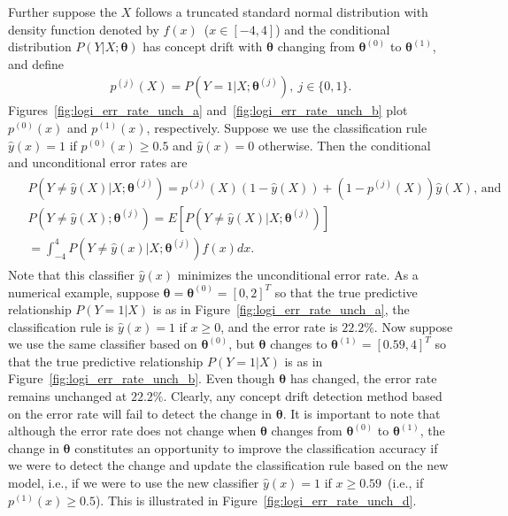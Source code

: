 \documentclass[twoside,11pt]{article}
\begin{document}
Further suppose the $X$ follows a truncated standard normal distribution with density function denoted by $f(x)$~($x\in[-4, 4]$) and the conditional distribution $P(Y|X;\bm{\theta})$ has concept drift with $\bm{\theta}$ changing from $\bm{\theta}^{(0)}$ to $\bm{\theta}^{(1)}$, and define 
\begin{align}
p^{(j)}(X)=P(Y=1|X;\bm{\theta}^{(j)}),~j\in\{0,1\}.
\label{eqn:simp_nota_p}
\end{align}
Figures~\ref{fig:logi_err_rate_unch_a} and~\ref{fig:logi_err_rate_unch_b} plot $p^{(0)}(x)$ and $p^{(1)}(x)$, respectively. Suppose we use the classification rule $\hat{y}(x)=1$ if $p^{(0)}(x)\geq 0.5$ and $\hat{y}(x)=0$ otherwise. Then the conditional and unconditional error rates are
\begin{align}
\begin{aligned}
&P(Y\neq\hat{y}(X)|X;\bm{\theta}^{(j)})
= p^{(j)}(X)(1-\hat{y}(X)) + (1-p^{(j)}(X))\hat{y}(X)\text{,~and} \\
&P(Y\neq\hat{y}(X);\bm{\theta}^{(j)}) = E[P(Y\neq\hat{y}(X)|X;\bm{\theta}^{(j)})] \\ &= \int_{-4}^{4}P(Y\neq\hat{y}(x)|X;\bm{\theta}^{(j)})f(x)dx.
\end{aligned}
\label{eqn:logi_err_rate}
\end{align}
Note that this classifier $\hat{y}(x)$ minimizes the unconditional error rate. As a numerical example, suppose $\bm{\theta} = \bm{\theta}^{(0)}=[0, 2]^T$ so that the true predictive relationship $P(Y=1|{X})$ is as in Figure~\ref{fig:logi_err_rate_unch_a}, the classification rule is $\hat{y}(x)=1$ if $x\geq 0$, and the error rate is $22.2\%$. Now suppose we use the same classifier based on $\bm{\theta}^{(0)}$, but $\bm{\theta}$ changes to $\bm{\theta}^{(1)}=[0.59, 4]^T$ so that the true predictive relationship $P(Y=1|{X})$ is as in Figure~\ref{fig:logi_err_rate_unch_b}. Even though $\bm{\theta}$ has changed, the error rate remains unchanged at $22.2\%$. Clearly, any concept drift detection method based on the error rate will fail to detect the change in $\bm{\theta}$. It is important to note that although the error rate does not change when $\bm{\theta}$ changes from $\bm{\theta}^{(0)}$ to $\bm{\theta}^{(1)}$, the change in $\bm{\theta}$ constitutes an opportunity to improve the classification accuracy if we were to detect the change and update the classification rule based on the new model, i.e., if we were to use the new classifier $\hat{y}(x)=1$ if $x \geq 0.59$~(i.e., if $p^{(1)}(x)\geq 0.5$). This is illustrated in Figure~\ref{fig:logi_err_rate_unch_d}.
\end{document}
